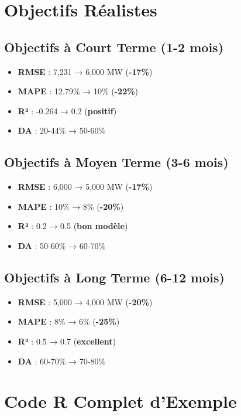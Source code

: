 \documentclass[12pt,a4paper]{article}
\begin{document}
\section{Objectifs Réalistes}

\subsection{Objectifs à Court Terme (1-2 mois)}

\begin{itemize}
    \item \textbf{RMSE} : 7,231 → 6,000 MW (\textbf{-17\%})
    \item \textbf{MAPE} : 12.79\% → 10\% (\textbf{-22\%})
    \item \textbf{R²} : -0.264 → 0.2 (\textbf{positif})
    \item \textbf{DA} : 20-44\% → 50-60\%
\end{itemize}

\subsection{Objectifs à Moyen Terme (3-6 mois)}

\begin{itemize}
    \item \textbf{RMSE} : 6,000 → 5,000 MW (\textbf{-17\%})
    \item \textbf{MAPE} : 10\% → 8\% (\textbf{-20\%})
    \item \textbf{R²} : 0.2 → 0.5 (\textbf{bon modèle})
    \item \textbf{DA} : 50-60\% → 60-70\%
\end{itemize}

\subsection{Objectifs à Long Terme (6-12 mois)}

\begin{itemize}
    \item \textbf{RMSE} : 5,000 → 4,000 MW (\textbf{-20\%})
    \item \textbf{MAPE} : 8\% → 6\% (\textbf{-25\%})
    \item \textbf{R²} : 0.5 → 0.7 (\textbf{excellent})
    \item \textbf{DA} : 60-70\% → 70-80\%
\end{itemize}

\section{Code R Complet d'Exemple}
\end{document}
